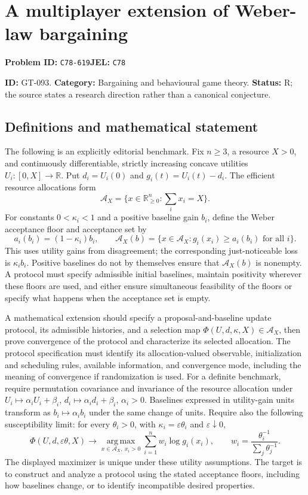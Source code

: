 \documentclass[11pt,a4paper]{article}
\begin{document}
\section*{A multiplayer extension of Weber-law bargaining}
\textbf{Problem ID:} \texttt{C78-619}\quad \textbf{JEL:} \texttt{C78}\par
\label{problem:OP-0223}
\label{game:GT-093}
{\sffamily\small\color{muted}
\noindent\textbf{ID:} GT-093. \textbf{Category:} Bargaining and behavioural game theory.
\textbf{Status:} R; the source states a research direction rather than a canonical conjecture.
\par}
\subsection*{Definitions and mathematical statement}
The following is an explicitly editorial benchmark. Fix $n\geq3$, a resource $X>0$, and continuously differentiable, strictly increasing concave utilities $U_i:[0,X]\to\mathbb R$. Put $d_i=U_i(0)$ and $g_i(t)=U_i(t)-d_i$. The efficient resource allocations form
\[
 \mathcal A_X=\{x\in\mathbb R_{\geq0}^n:\sum_i x_i=X\}.
\]
For constants $0<\kappa_i<1$ and a positive baseline gain $b_i$, define the Weber acceptance floor and acceptance set by
\[
 a_i(b_i)=(1-\kappa_i)b_i,\qquad
 \mathcal A_X(b)=\{x\in\mathcal A_X:g_i(x_i)\geq a_i(b_i)\text{ for all }i\}.
\]
This uses utility gains from disagreement; the corresponding just-noticeable loss is $\kappa_i b_i$. Positive baselines do not by themselves ensure that $\mathcal A_X(b)$ is nonempty. A protocol must specify admissible initial baselines, maintain positivity wherever these floors are used, and either ensure simultaneous feasibility of the floors or specify what happens when the acceptance set is empty.

A mathematical extension should specify a proposal-and-baseline update protocol, its admissible histories, and a selection map
$\Phi(U,d,\kappa,X)\in\mathcal A_X$, then prove convergence of the protocol and characterize its selected allocation. The protocol specification must identify its allocation-valued observable, initialization and scheduling rules, available information, and convergence mode, including the meaning of convergence if randomization is used. For a definite benchmark, require permutation covariance and invariance of the resource allocation under $U_i\mapsto\alpha_iU_i+\beta_i$, $d_i\mapsto\alpha_id_i+\beta_i$, $\alpha_i>0$. Baselines expressed in utility-gain units transform as $b_i\mapsto\alpha_i b_i$ under the same change of units. Require also the following susceptibility limit: for every $\theta_i>0$, with $\kappa_i=\varepsilon\theta_i$ and $\varepsilon\downarrow0$,
\[
 \Phi(U,d,\varepsilon\theta,X)\longrightarrow
 \operatorname*{arg\,max}_{x\in\mathcal A_X,\ x_i>0}
          \sum_{i=1}^n w_i\log g_i(x_i),\qquad
 w_i=\frac{\theta_i^{-1}}{\sum_j\theta_j^{-1}}.
\]
The displayed maximizer is unique under these utility assumptions. The target is to construct and analyze a protocol using the stated acceptance floors, including how baselines change, or to identify incompatible desired properties.
\end{document}
